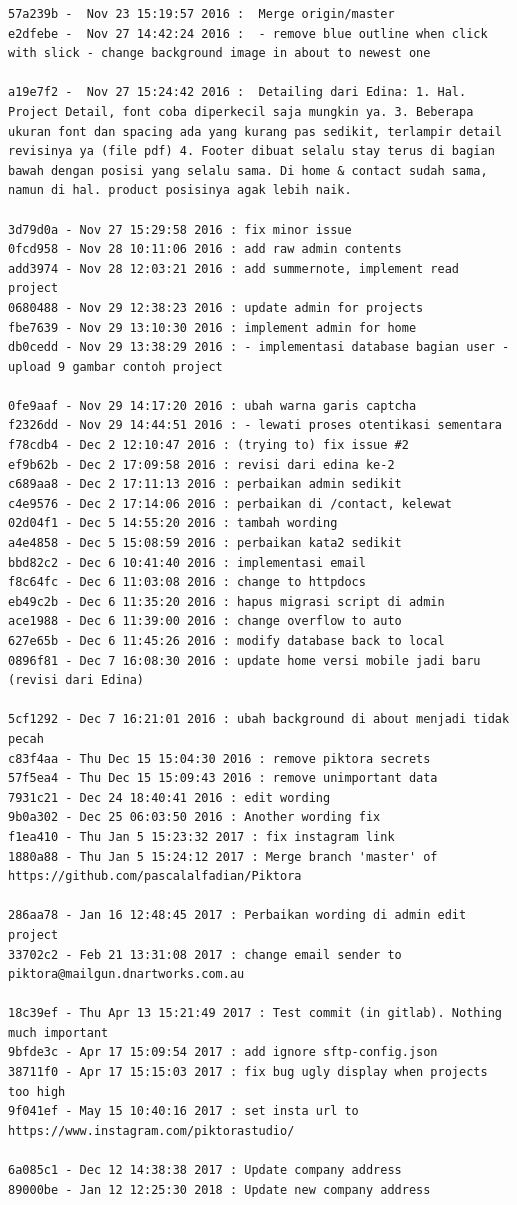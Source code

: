 \begin{lstlisting}[caption={\textit{Commit history} pada proyek Piktora},label={lst:all_commit_piktora},language=plaintext]
57a239b -  Nov 23 15:19:57 2016 :  Merge origin/master
e2dfebe -  Nov 27 14:42:24 2016 :  - remove blue outline when click with slick - change background image in about to newest one

a19e7f2 -  Nov 27 15:24:42 2016 :  Detailing dari Edina: 1. Hal. Project Detail, font coba diperkecil saja mungkin ya. 3. Beberapa ukuran font dan spacing ada yang kurang pas sedikit, terlampir detail revisinya ya (file pdf) 4. Footer dibuat selalu stay terus di bagian bawah dengan posisi yang selalu sama. Di home & contact sudah sama, namun di hal. product posisinya agak lebih naik.

3d79d0a - Nov 27 15:29:58 2016 : fix minor issue
0fcd958 - Nov 28 10:11:06 2016 : add raw admin contents
add3974 - Nov 28 12:03:21 2016 : add summernote, implement read project
0680488 - Nov 29 12:38:23 2016 : update admin for projects
fbe7639 - Nov 29 13:10:30 2016 : implement admin for home
db0cedd - Nov 29 13:38:29 2016 : - implementasi database bagian user - upload 9 gambar contoh project

0fe9aaf - Nov 29 14:17:20 2016 : ubah warna garis captcha
f2326dd - Nov 29 14:44:51 2016 : - lewati proses otentikasi sementara
f78cdb4 - Dec 2 12:10:47 2016 : (trying to) fix issue #2
ef9b62b - Dec 2 17:09:58 2016 : revisi dari edina ke-2
c689aa8 - Dec 2 17:11:13 2016 : perbaikan admin sedikit
c4e9576 - Dec 2 17:14:06 2016 : perbaikan di /contact, kelewat
02d04f1 - Dec 5 14:55:20 2016 : tambah wording
a4e4858 - Dec 5 15:08:59 2016 : perbaikan kata2 sedikit
bbd82c2 - Dec 6 10:41:40 2016 : implementasi email
f8c64fc - Dec 6 11:03:08 2016 : change to httpdocs
eb49c2b - Dec 6 11:35:20 2016 : hapus migrasi script di admin
ace1988 - Dec 6 11:39:00 2016 : change overflow to auto
627e65b - Dec 6 11:45:26 2016 : modify database back to local
0896f81 - Dec 7 16:08:30 2016 : update home versi mobile jadi baru (revisi dari Edina)

5cf1292 - Dec 7 16:21:01 2016 : ubah background di about menjadi tidak pecah
c83f4aa - Thu Dec 15 15:04:30 2016 : remove piktora secrets
57f5ea4 - Thu Dec 15 15:09:43 2016 : remove unimportant data
7931c21 - Dec 24 18:40:41 2016 : edit wording
9b0a302 - Dec 25 06:03:50 2016 : Another wording fix
f1ea410 - Thu Jan 5 15:23:32 2017 : fix instagram link
1880a88 - Thu Jan 5 15:24:12 2017 : Merge branch 'master' of https://github.com/pascalalfadian/Piktora

286aa78 - Jan 16 12:48:45 2017 : Perbaikan wording di admin edit project
33702c2 - Feb 21 13:31:08 2017 : change email sender to piktora@mailgun.dnartworks.com.au

18c39ef - Thu Apr 13 15:21:49 2017 : Test commit (in gitlab). Nothing much important
9bfde3c - Apr 17 15:09:54 2017 : add ignore sftp-config.json
38711f0 - Apr 17 15:15:03 2017 : fix bug ugly display when projects too high
9f041ef - May 15 10:40:16 2017 : set insta url to https://www.instagram.com/piktorastudio/

6a085c1 - Dec 12 14:38:38 2017 : Update company address
89000be - Jan 12 12:25:30 2018 : Update new company address
\end{lstlisting}


